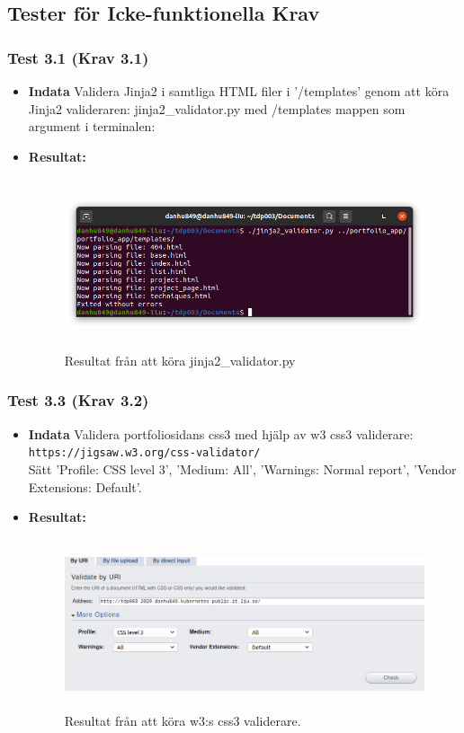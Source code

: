 \documentclass{TDP003mall}
\begin{document}
\subsection{Tester för Icke-funktionella Krav}
\subsubsection*{Test 3.1 (Krav 3.1)}
\begin{itemize}
\item[]\textbf{Indata} Validera Jinja2 i samtliga HTML filer i '/templates' genom att köra Jinja2 valideraren: jinja2\_validator.py med /templates mappen som argument i terminalen:
\item[]\textbf{Resultat:}
\begin{figure}[h!]
\centerline{\includegraphics[width=\textwidth, height=5cm]{../Pictures/jinja2_validated.png}}
\caption{Resultat från att köra jinja2\_validator.py\label{fig:}}
\end{figure}
\end{itemize}
\subsubsection*{Test 3.3 (Krav 3.2)}
\begin{itemize}
\item[]\textbf{Indata} Validera portfoliosidans css3 med hjälp av w3 css3 validerare:\\ \texttt{https://jigsaw.w3.org/css-validator/}\\Sätt 'Profile: CSS level 3', 'Medium: All', 'Warnings: Normal report', 'Vendor Extensions: Default'.
\item[]\textbf{Resultat:}
\begin{figure}[h!]
\centerline{\includegraphics[width=\textwidth, height=5cm]{../Pictures/css3_validation.png}}
\caption{Resultat från att köra w3:s css3 validerare.\label{fig:}}
\end{figure}
\end{itemize}
\end{document}
